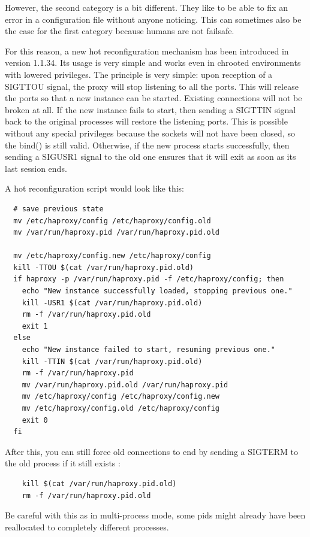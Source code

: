 However, the second category is a bit different. They like to be able to fix an
error in a configuration file without anyone noticing. This can sometimes also
be the case for the first category because humans are not failsafe.

For this reason, a new hot reconfiguration mechanism has been introduced in
version 1.1.34. Its usage is very simple and works even in chrooted
environments with lowered privileges. The principle is very simple: upon
reception of a SIGTTOU signal, the proxy will stop listening to all the ports.
This will release the ports so that a new instance can be started. Existing
connections will not be broken at all. If the new instance fails to start,
then sending a SIGTTIN signal back to the original processes will restore
the listening ports. This is possible without any special privileges because
the sockets will not have been closed, so the bind() is still valid. Otherwise,
if the new process starts successfully, then sending a SIGUSR1 signal to the
old one ensures that it will exit as soon as its last session ends.

A hot reconfiguration script would look like this:

\begin{verbatim}
  # save previous state
  mv /etc/haproxy/config /etc/haproxy/config.old
  mv /var/run/haproxy.pid /var/run/haproxy.pid.old

  mv /etc/haproxy/config.new /etc/haproxy/config
  kill -TTOU $(cat /var/run/haproxy.pid.old)
  if haproxy -p /var/run/haproxy.pid -f /etc/haproxy/config; then
    echo "New instance successfully loaded, stopping previous one."
    kill -USR1 $(cat /var/run/haproxy.pid.old)
    rm -f /var/run/haproxy.pid.old
    exit 1
  else
    echo "New instance failed to start, resuming previous one."
    kill -TTIN $(cat /var/run/haproxy.pid.old)
    rm -f /var/run/haproxy.pid
    mv /var/run/haproxy.pid.old /var/run/haproxy.pid
    mv /etc/haproxy/config /etc/haproxy/config.new
    mv /etc/haproxy/config.old /etc/haproxy/config
    exit 0
  fi
\end{verbatim}

After this, you can still force old connections to end by sending
a SIGTERM to the old process if it still exists :

\begin{verbatim}
    kill $(cat /var/run/haproxy.pid.old)
    rm -f /var/run/haproxy.pid.old
\end{verbatim}

Be careful with this as in multi-process mode, some pids might already
have been reallocated to completely different processes.

